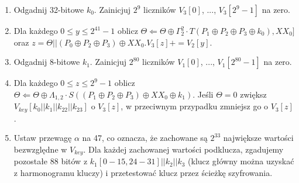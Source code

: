 \begin{enumerate}
    \item Odgadnij 32-bitowe $k_0$. Zainicjuj $2^{9}$ liczników $V_3[0]$, ..., $V_3[2^{9}-1]$ na zero.\\
    \item Dla każdego $0\leq y \leq 2^{41}-1 $ oblicz $\Theta \Leftarrow \Theta \oplus \Gamma^{2}_{2} \cdot T(P_{1} \oplus P_{2} \oplus P_{3} \oplus k_{0}), XX_{0}]$ oraz $z=\Theta || (P_{0} \oplus P_{2} \oplus P_{3}) \oplus XX_{0}. V_3[z]+=V_2[y]$.\\
    \item Odgadnij 8-bitowe $k_1$. Zainicjuj $2^{80}$ liczników $V_1[0]$, ..., $V_1[2^{80}-1]$ na zero.\\
    \item Dla każdego $0\leq z \leq 2^{9}-1 $ oblicz $\Theta \Leftarrow \Theta \oplus \Lambda_{1,2} \cdot S((P_{1} \oplus P_{2} \oplus P_{3})\oplus XX_{0} \oplus k_{1})$. Jeśli $\Theta =0$ zwiększ $V_{key}[k_0 || k_1 || k_{22} || k_{23}]$ o $V_3[z]$, w przeciwnym przypadku zmniejsz go o $V_3[z]$.\\
    \item Ustaw przewagę $\alpha$ na 47, co oznacza, że zachowane są $2^{33}$ największe wartości bezwzględne w $V_{key}$. Dla każdej zachowanej wartości podklucza, zgadujemy pozostałe 88 bitów z $k_1[0-15, 24-31] || k_2 || k_3$ (klucz główny można uzyskać z harmonogramu kluczy) i przetestować klucz przez ścieżkę szyfrowania.\\
\end{enumerate}

